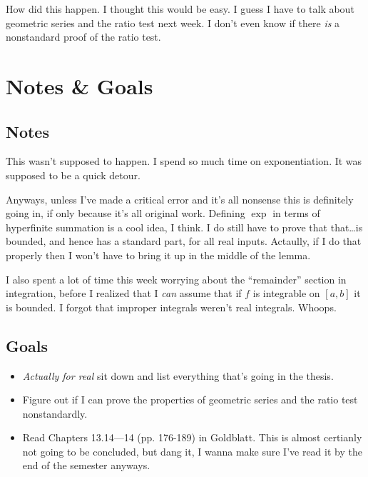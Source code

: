 \documentclass{article}
\theoremstyle{definition}
\begin{document}
How did this happen. I thought this would be easy. I guess I have to talk about geometric series and the ratio test next week. I don't even know if there \textit{is} a nonstandard proof of the ratio test.

\section{Notes \& Goals}
\subsection{Notes}
This wasn't supposed to happen. I spend so much time on exponentiation. It was supposed to be a quick detour.

Anyways, unless I've made a critical error and it's all nonsense this is definitely going in, if only because it's all original work. Defining $\exp$ in terms of hyperfinite summation is a cool idea, I think. I do still have to prove that that\dots is bounded, and hence has a standard part, for all real inputs. Actaully, if I do that properly then I won't have to bring it up in the middle of the lemma.

I also spent a lot of time this week worrying about the ``remainder'' section in integration, before I realized that I \textit{can} assume that if $f$ is integrable on $[a, b]$ it is bounded. I forgot that improper integrals weren't real integrals. Whoops.

\subsection{Goals}
\begin{itemize}
    \item \textit{Actually for real} sit down and list everything that's going in the thesis. 
    \item Figure out if I can prove the properties of geometric series and the ratio test nonstandardly.
    \item Read Chapters 13.14---14 (pp. 176-189) in Goldblatt. This is almost certianly not going to be concluded, but dang it, I wanna make sure I've read it by the end of the semester anyways.
\end{itemize}

\nocite{goldblatt1998}
\printbibliography[title={Things I'm Looking At}]
\end{document}
